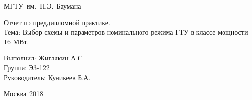 \documentclass[a4paper,12pt]{article}
\begin{document}
 \begin{titlepage}

        \begin{center}
            \begin{Large}
            МГТУ\ им.\ Н.Э.\ Баумана\\
            \end{Large}
            \begin{large}
            \vspace{6cm}
            Отчет по преддипломной практике.\\
            Тема: Выбор схемы и параметров номинального режима ГТУ в классе мощности 16 МВт.\\
            \vfill
            \end{large}
        \end{center}

        \begin{flushright}
            \begin{large}
            Выполнил: Жигалкин А.С.\\
            Группа: Э3-122\\
            Руководитель: Куникеев Б.А.\\
            \vspace{2cm}
            \end{large}
        \end{flushright}

        \begin{large}
            \begin{center}
           Москва\ 2018
            \end{center}
        \end{large}

 \end{titlepage}

    \tableofcontents
    \newpage

%	
%   
\end{document}
